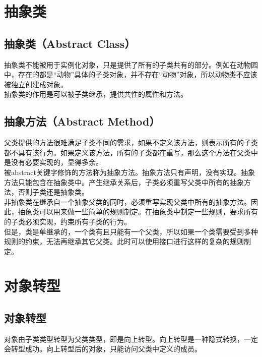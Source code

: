 \newpage

\section{抽象类}

\subsection{抽象类（Abstract Class）}

抽象类不能被用于实例化对象，只是提供了所有的子类共有的部分。例如在动物园中，存在的都是“动物”具体的子类对象，并不存在“动物”对象，所以动物类不应该被独立创建成对象。\\

抽象类的作用是可以被子类继承，提供共性的属性和方法。\\

\subsection{抽象方法（Abstract Method）}

父类提供的方法很难满足子类不同的需求，如果不定义该方法，则表示所有的子类都不具有该行为。如果定义该方法，所有的子类都在重写，那么这个方法在父类中是没有必要实现的，显得多余。\\

被abstract关键字修饰的方法称为抽象方法。抽象方法只有声明，没有实现。抽象方法只能包含在抽象类中。产生继承关系后，子类必须重写父类中所有的抽象方法，否则子类还是抽象类。\\

非抽象类在继承自一个抽象父类的同时，必须重写实现父类中所有的抽象方法。因此，抽象类可以用来做一些简单的规则制定。在抽象类中制定一些规则，要求所有的子类必须实现，约束所有子类的行为。\\

但是，类是单继承的，一个类有且只能有一个父类，所以如果一个类需要受到多种规则的约束，无法再继承其它父类。此时可以使用接口进行这样的复杂的规则制定。

\newpage

\section{对象转型}

\subsection{对象转型}

对象由子类类型转型为父类类型，即是向上转型。向上转型是一种隐式转换，一定会转型成功。向上转型后的对象，只能访问父类中定义的成员。\\

